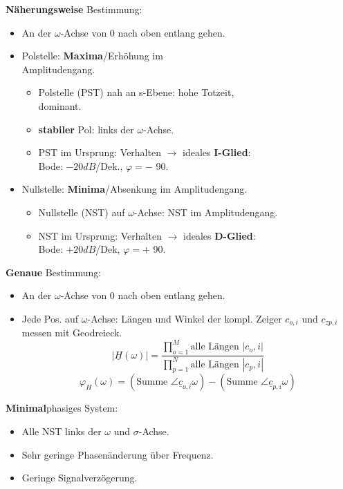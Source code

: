 \textbf{Näherungsweise} Bestimmung:
\begin{itemize}
\item An der $\omega$-Achse von 0 nach oben entlang gehen.
\item Polstelle: \textbf{Maxima}/Erhöhung im\\ Amplitudengang.
\begin{itemize}
	\item Polstelle (PST) nah an s-Ebene: hohe Totzeit, \\dominant.
	\item \textbf{stabiler} Pol: links der $\omega$-Achse.
	\item PST im Ursprung: Verhalten $\rightarrow$ ideales \textbf{I-Glied}:\\ Bode: $-20dB$/Dek., $\varphi=-$ 90\textdegree.
\end{itemize}
\item Nullstelle: \textbf{Minima}/Absenkung im Amplitudengang.
\begin{itemize}
	\item Nullstelle (NST) auf $\omega$-Achse: NST im Amplitudengang.
	\item NST im Ursprung: Verhalten $\rightarrow$ ideales \textbf{D-Glied}:\\ Bode: $+20dB$/Dek, $ \varphi=+$ 90\textdegree.
\end{itemize}

\end{itemize}
\textbf{Genaue} Bestimmung:
\begin{itemize}
	\item An der $\omega$-Achse von 0 nach oben entlang gehen.
	\item Jede Pos. auf $\omega$-Achse: Längen und Winkel der kompl. Zeiger $c_{o,i}$ und $c_{zp,i}$ messen mit Geodreieck.
	\[
	|\underline{H}(\omega)|=\frac{\prod_{o=1}^{M}\text{alle Längen } |c_o,i|}{\prod_{p=1}^{N}\text{alle Längen } |c_p,i|}
	\]
	\[
	\varphi_H(\omega)=(\text{Summe } \angle \underline{c}_{o,i}{\omega})-(\text{Summe } \angle \underline{c}_{p,i}{\omega})
	\]
\end{itemize}
\textbf{Minimal}phasiges System:
\begin{itemize}
	\item Alle NST links der $\omega$ und $\sigma$-Achse.
	\item Sehr geringe Phasen\"anderung \"uber Frequenz.
	\item Geringe Signalverz\"ogerung.
\end{itemize}

